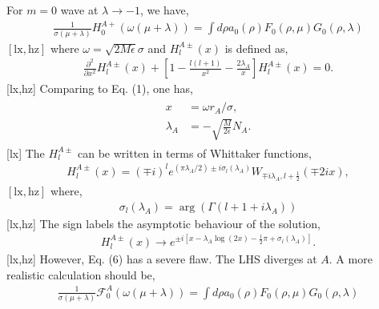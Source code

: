 \documentclass[11pt]{diazessay} %
\begin{document}
For $m=0$ wave at $\lambda \rightarrow-1$, we have,
\begin{align*}
\frac{1}{\sigma(\mu+\lambda)} H_0^{A+}(\omega(\mu+\lambda))=\int d \rho a_0(\rho) F_0(\rho, \mu) G_0(\rho, \lambda)
\end{align*}
$[\mathrm{lx}, \mathrm{hz}]$ where $\omega=\sqrt{2 M \epsilon} \sigma$ and $H_l^{A \pm}(x)$ is defined as,
\begin{align*}
\frac{\partial^2}{\partial x^2} H_l^{A \pm}(x)+\left[1-\frac{l(l+1)}{x^2}-\frac{2 \lambda_A}{x}\right] H_l^{A \pm}(x)=0 .
\end{align*}
[lx,hz] Comparing to Eq. (1), one has,
\begin{align*}
\begin{aligned}
x & =\omega r_A / \sigma, \\
\lambda_A & =-\sqrt{\frac{M}{2 \epsilon}} N_A .
\end{aligned}
\end{align*}
[lx] The $H_l^{A \pm}$ can be written in terms of Whittaker functions,
\begin{align*}
H_l^{A \pm}(x)=(\mp i)^l e^{\left(\pi \lambda_A / 2\right) \pm i \sigma_l\left(\lambda_A\right)} W_{\mp i \lambda_A, l+\frac{1}{2}}(\mp 2 i x),
\end{align*}
$[\mathrm{lx}, \mathrm{hz}]$ where,
\begin{align*}
\sigma_l\left(\lambda_A\right)=\arg \left(\Gamma\left(l+1+i \lambda_A\right)\right)
\end{align*}
[lx,hz] The \pm sign labels the asymptotic behaviour of the solution,
\begin{align*}
H_l^{A \pm}(x) \rightarrow e^{ \pm i\left[x-\lambda_A \log (2 x)-\frac{l}{2} \pi+\sigma_l\left(\lambda_A\right)\right]} .
\end{align*}
[lx,hz]
However, Eq. (6) has a severe flaw. The LHS diverges at $A$. A more realistic calculation should be,
\begin{align*}
\frac{1}{\sigma(\mu+\lambda)} \mathcal{F}_0^A(\omega(\mu+\lambda))=\int d \rho a_0(\rho) F_0(\rho, \mu) G_0(\rho, \lambda)
\end{align*}
\end{document}

